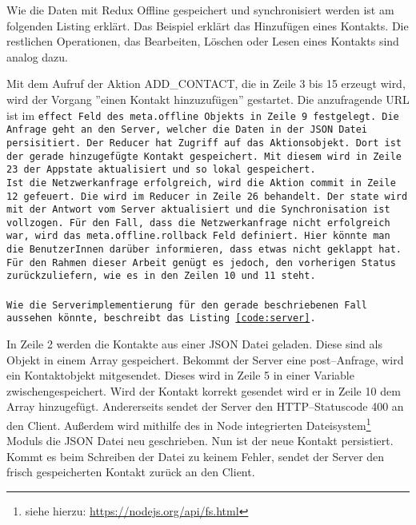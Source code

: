 Wie die Daten mit Redux Offline gespeichert und synchronisiert werden ist am folgenden Listing erklärt.
Das Beispiel erklärt das Hinzufügen eines Kontakts. Die restlichen Operationen, das Bearbeiten, Löschen oder Lesen eines Kontakts sind analog dazu. 
\begin{center}  
\end{center}
%
Mit dem Aufruf der Aktion ADD\_CONTACT, die in Zeile 3 bis 15 erzeugt wird, wird der Vorgang ''einen Kontakt hinzuzufügen'' gestartet.
Die anzufragende URL ist im \tt{effect} Feld des \tt{meta.offline} Objekts in Zeile 9 festgelegt. Die Anfrage geht an den Server, welcher die Daten in der \gls{JSON} Datei persisitiert.
Der Reducer hat Zugriff auf das Aktionsobjekt. Dort ist der gerade hinzugefügte Kontakt gespeichert. Mit diesem wird in Zeile 23 der Appstate aktualisiert und so lokal gespeichert.\\
Ist die Netzwerkanfrage erfolgreich, wird die Aktion \tt{commit} in Zeile 12 gefeuert.
Die wird im Reducer in Zeile 26 behandelt. Der \tt{state} wird mit der Antwort vom Server aktualisiert und die Synchronisation ist vollzogen.
Für den Fall, dass die Netzwerkanfrage nicht erfolgreich war, wird das \tt{meta.offline.rollback} Feld definiert.
Hier könnte man die BenutzerInnen darüber informieren, dass etwas nicht geklappt hat.
Für den Rahmen dieser Arbeit genügt es jedoch, den vorherigen Status zurückzuliefern, wie es in den Zeilen 10 und 11 steht.\\\\
Wie die Serverimplementierung für den gerade beschriebenen Fall aussehen könnte, beschreibt das Listing \ref{code:server}.
%
\begin{center}  
\end{center}
%
In Zeile 2 werden die Kontakte aus einer \gls{JSON} Datei geladen. Diese sind als Objekt in einem Array gespeichert.
Bekommt der Server eine post--Anfrage, wird ein Kontaktobjekt mitgesendet. Dieses wird in Zeile 5 in einer Variable zwischengespeichert. 
Wird der Kontakt korrekt gesendet wird er in Zeile 10 dem Array hinzugefügt.
Andererseits sendet der Server den \gls{HTTP}--Statuscode 400 an den Client. %
Außerdem wird mithilfe des in Node integrierten Dateisystem\footnote{siehe hierzu: \url{https://nodejs.org/api/fs.html}} Moduls die \gls{JSON} Datei neu geschrieben.
Nun ist der neue Kontakt persistiert. Kommt es beim Schreiben der Datei zu keinem Fehler, sendet der Server den frisch gespeicherten Kontakt zurück an den Client.